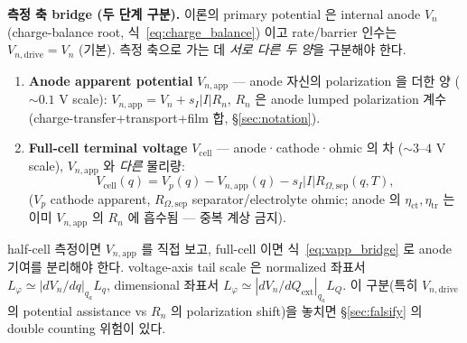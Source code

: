 \documentclass[11pt,a4paper]{article}
\newcommand{\app}{\mathrm{app}}
\newcommand{\dimedrive}{\mathrm{drive}}
\newcommand{\cell}{\mathrm{cell}}
\newcommand{\ext}{\mathrm{ext}}
\begin{document}
\textbf{측정 축 bridge (두 단계 구분).} 이론의 primary potential 은 internal anode
$V_n$ (charge-balance root, 식~\eqref{eq:charge_balance}) 이고 rate/barrier 인수는
$V_{n,\dimedrive}=V_n$ (기본). 측정 축으로 가는 데 \emph{서로 다른 두 양}을 구분해야 한다.
\begin{enumerate}[label=(\roman*)]
\item \textbf{Anode apparent potential} $V_{n,\app}$ — anode 자신의 polarization 을 더한
  양 ($\sim0.1$ V scale): $V_{n,\app}=V_n+s_I|I|R_n$, $R_n$ 은 anode lumped polarization
  계수 (charge-transfer+transport+film 합, \S\ref{sec:notation}).
\item \textbf{Full-cell terminal voltage} $V_{\cell}$ — anode·cathode·ohmic 의 차
  ($\sim3$--$4$ V scale), $V_{n,\app}$ 와 \emph{다른} 물리량:
  \begin{equation}
  V_{\cell}(q)=V_p(q)-V_{n,\app}(q)-s_I|I| R_{\Omega,\mathrm{sep}}(q,T),
  \label{eq:vapp_bridge}
  \end{equation}
  ($V_p$ cathode apparent, $R_{\Omega,\mathrm{sep}}$ separator/electrolyte ohmic; anode
  의 $\eta_{\mathrm{ct}},\eta_{\mathrm{tr}}$ 는 이미 $V_{n,\app}$ 의 $R_n$ 에 흡수됨 —
  중복 계상 금지).
\end{enumerate}
half-cell 측정이면 $V_{n,\app}$ 를 직접 보고, full-cell 이면 식~\eqref{eq:vapp_bridge} 로
anode 기여를 분리해야 한다. voltage-axis tail scale 은 normalized 좌표서 $L_\varphi\simeq
|dV_n/dq|_{q_a}L_q$, dimensional 좌표서 $L_\varphi\simeq|dV_n/dQ_\ext|_{q_a}L_Q$.
이 구분(특히 $V_{n,\dimedrive}$ 의 potential assistance vs $R_n$ 의 polarization shift)을
놓치면 \S\ref{sec:falsify} 의 double counting 위험이 있다.

\end{document}
